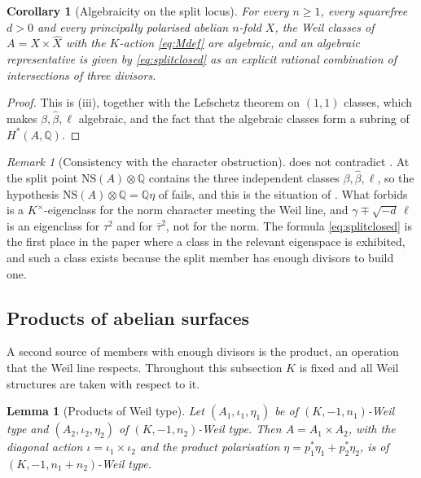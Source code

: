 \documentclass[11pt,reqno]{amsart}
\theoremstyle{plain}
\newtheorem{lemma}[theorem]{Lemma}
\newtheorem{corollary}[theorem]{Corollary}
\theoremstyle{definition}
\theoremstyle{remark}
\newtheorem{remark}[theorem]{Remark}
\newcommand{\QQ}{\mathbb{Q}}
\newcommand{\NS}{\mathrm{NS}}
\newcommand{\Kx}{K^{\times}}
\newcommand{\bbar}[1]{\overline{#1}}
\begin{document}
\begin{corollary}[Algebraicity on the split locus]\label{cor:splitalgebraic}
For every $n\ge1$, every squarefree $d>0$ and every principally polarised
abelian $n$-fold $X$, the Weil classes of $A=X\times\widehat{X}$ with the
$K$-action \eqref{eq:Mdef} are algebraic, and an algebraic representative is
given by \eqref{eq:splitclosed} as an explicit rational combination of
intersections of three divisors.
\end{corollary}

\begin{proof}
This is (iii), together with the Lefschetz theorem on
$(1,1)$ classes, which makes $\beta,\widehat{\beta},\ell$ algebraic, and the
fact that the algebraic classes form a subring of $H^{*}(A,\QQ)$.
\end{proof}

\begin{remark}[Consistency with the character obstruction]\label{rem:splitconsistent}
 does not contradict . At the
split point $\NS(A)\otimes\QQ$ contains the three independent classes
$\beta,\widehat{\beta},\ell$, so the hypothesis
$\NS(A)\otimes\QQ=\QQ\eta$ of  fails, and this is the
situation of \cite[Remark~2.5]{paperIII}. What  forbids is a
$\Kx$-eigenclass for the norm character meeting the Weil line, and
$\gamma\mp\sqrt{-d}\,\ell$ is an eigenclass for $\tau^{2}$ and for
$\bbar{\tau}^{2}$, not for the norm. The formula \eqref{eq:splitclosed} is
the first place in the paper where a class in the relevant eigenspace is
exhibited, and such a class exists because the split member has enough
divisors to build one.
\end{remark}

\subsection{Products of abelian surfaces}\label{ssec:products}

A second source of members with enough divisors is the product, an operation
that the Weil line respects. Throughout this subsection $K$ is fixed and all
Weil structures are taken with respect to it.

\begin{lemma}[Products of Weil type]\label{lem:prodweil}
Let $(A_{1},\iota_{1},\eta_{1})$ be of $(K,-1,n_{1})$-Weil type and
$(A_{2},\iota_{2},\eta_{2})$ of $(K,-1,n_{2})$-Weil type. Then
$A=A_{1}\times A_{2}$, with the diagonal action
$\iota=\iota_{1}\times\iota_{2}$ and the product polarisation
$\eta=p_{1}^{*}\eta_{1}+p_{2}^{*}\eta_{2}$, is of
$(K,-1,n_{1}+n_{2})$-Weil type.
\end{lemma}
\end{document}
